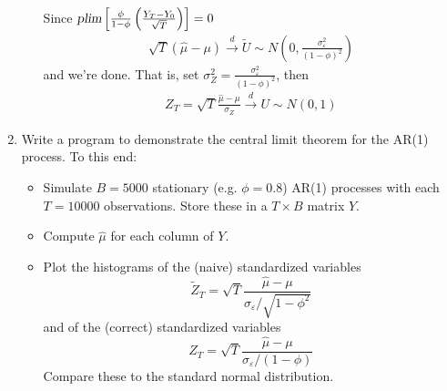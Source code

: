 \begin{enumerate}
\begin{enumerate}
\begin{solution}
                        Since $\textsl{plim}\left[\frac{\phi}{1-\phi}\left(\frac{Y_T - Y_0}{\sqrt{T}}\right)\right] = 0$
                        \begin{align*}
                            \sqrt{T}\left(\hat{\mu}-\mu\right) \overset{d}{\rightarrow} \tilde{U} \sim N\left(0,\frac{\sigma_\varepsilon^2}{(1-\phi)^2}\right)
                        \end{align*}
                        and we're done. That is, set $\sigma_Z^2 = \frac{\sigma_\varepsilon^2}{(1-\phi)^2}$, then
                        \begin{align*}
                            Z_T = \sqrt{T}\frac{\hat{\mu}-\mu}{\sigma_Z} \overset{d}{\rightarrow} U \sim N(0,1)
                        \end{align*}
                    \end{solution}
          \end{enumerate}
    \item Write a program to demonstrate the central limit theorem for the AR(1) process. To this end:
          \begin{itemize}
              \item Simulate $B=5000$ stationary (e.g. $\phi=0.8$) AR(1) processes with each $T=10000$ observations. Store these in a $T \times B$ matrix $Y$.
              \item Compute $\hat{\mu}$ for each column of $Y$.
              \item Plot the histograms of the (naive) standardized variables $$ \widetilde{Z}_T = \sqrt{T}\frac{\hat{\mu}-\mu}{\sigma_{\varepsilon }/\sqrt{1-\phi^2}}$$ and of the (correct) standardized variables $$ Z_T = \sqrt{T}\frac{\hat{\mu}-\mu}{\sigma_{\varepsilon }/(1-\phi)}$$ Compare these to the standard normal distribution.
          \end{itemize}
          \begin{solution}~
              
          \end{solution}
\end{enumerate}
